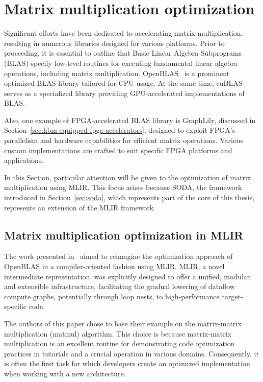 \section{Matrix multiplication optimization}
\label{sec:matmul-optimization}%

Significant efforts have been dedicated to accelerating matrix multiplication, resulting in numerous libraries designed for various platforms.
Prior to proceeding, it is essential to outline that Basic Linear Algebra Subprograms (BLAS) specify low-level routines for executing fundamental linear algebra operations, including matrix multiplication.
OpenBLAS~\cite{openblas} is a prominent optimized BLAS library tailored for CPU usage.
At the same time, cuBLAS~\cite{cublas} serves as a specialized library providing GPU-accelerated implementations of BLAS\@.

Also, one example of FPGA-accelerated BLAS library is GraphLily, discussed in Section~\ref{sec:hbm-equipped-fpga-accelerators}, designed to exploit FPGA's parallelism and hardware capabilities for efficient matrix operations.
Various custom implementations are crafted to suit specific FPGA platforms and applications.

In this Section, particular attention will be given to the optimization of matrix multiplication using MLIR.
This focus arises because SODA, the framework introduced in Section~\ref{sec:soda}, which represents part of the core of this thesis, represents an extension of the MLIR framework.

\subsection{Matrix multiplication optimization in MLIR}
\label{subsec:matmul-opt-mlir}%

The work presented in~\cite{DBLP:journals/corr/abs-2003-00532} aimed to reimagine the optimization approach of OpenBLAS in a compiler-oriented fashion using MLIR.
MLIR, a novel intermediate representation, was explicitly designed to offer a unified, modular, and extensible infrastructure, facilitating the gradual lowering of dataflow compute graphs, potentially through loop nests, to high-performance target-specific code.

The authors of this paper chose to base their example on the matrix-matrix multiplication (matmul) algorithm.
This choice is because matrix-matrix multiplication is an excellent routine for demonstrating code optimization practices in tutorials and a crucial operation in various domains.
Consequently, it is often the first task for which developers create an optimized implementation when working with a new architecture.

